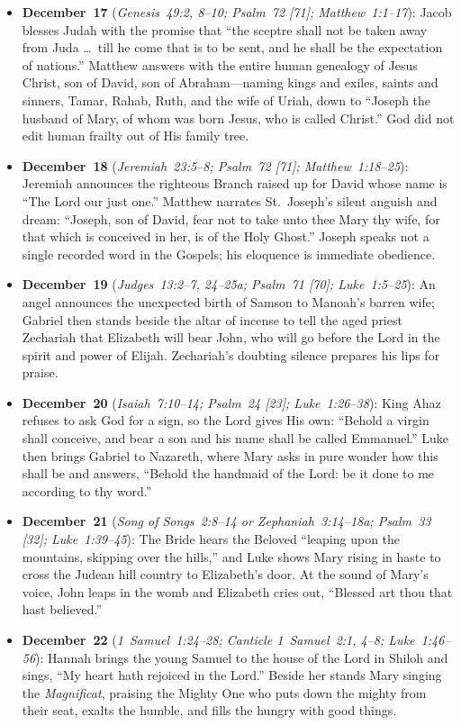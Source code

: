 \begin{itemize}
  \item \textbf{December~17} (\textit{Genesis~49:2, 8--10; Psalm~72 [71]; Matthew~1:1--17}): Jacob blesses Judah with the promise that ``the sceptre shall not be taken away from Juda \dots\ till he come that is to be sent, and he shall be the expectation of nations.'' Matthew answers with the entire human genealogy of Jesus Christ, son of David, son of Abraham---naming kings and exiles, saints and sinners, Tamar, Rahab, Ruth, and the wife of Uriah, down to ``Joseph the husband of Mary, of whom was born Jesus, who is called Christ.'' God did not edit human frailty out of His family tree.
  \item \textbf{December~18} (\textit{Jeremiah~23:5--8; Psalm~72 [71]; Matthew~1:18--25}): Jeremiah announces the righteous Branch raised up for David whose name is ``The Lord our just one.'' Matthew narrates St.~Joseph's silent anguish and dream: ``Joseph, son of David, fear not to take unto thee Mary thy wife, for that which is conceived in her, is of the Holy Ghost.'' Joseph speaks not a single recorded word in the Gospels; his eloquence is immediate obedience.
  \item \textbf{December~19} (\textit{Judges~13:2--7, 24--25a; Psalm~71 [70]; Luke~1:5--25}): An angel announces the unexpected birth of Samson to Manoah's barren wife; Gabriel then stands beside the altar of incense to tell the aged priest Zechariah that Elizabeth will bear John, who will go before the Lord in the spirit and power of Elijah. Zechariah's doubting silence prepares his lips for praise.
  \item \textbf{December~20} (\textit{Isaiah~7:10--14; Psalm~24 [23]; Luke~1:26--38}): King Ahaz refuses to ask God for a sign, so the Lord gives His own: ``Behold a virgin shall conceive, and bear a son and his name shall be called Emmanuel.'' Luke then brings Gabriel to Nazareth, where Mary asks in pure wonder how this shall be and answers, ``Behold the handmaid of the Lord: be it done to me according to thy word.''
  \item \textbf{December~21} (\textit{Song of Songs~2:8--14 or Zephaniah~3:14--18a; Psalm~33 [32]; Luke~1:39--45}): The Bride hears the Beloved ``leaping upon the mountains, skipping over the hills,'' and Luke shows Mary rising in haste to cross the Judean hill country to Elizabeth's door. At the sound of Mary's voice, John leaps in the womb and Elizabeth cries out, ``Blessed art thou that hast believed.''
  \item \textbf{December~22} (\textit{1~Samuel~1:24--28; Canticle 1~Samuel~2:1, 4--8; Luke~1:46--56}): Hannah brings the young Samuel to the house of the Lord in Shiloh and sings, ``My heart hath rejoiced in the Lord.'' Beside her stands Mary singing the \textit{Magnificat}, praising the Mighty One who puts down the mighty from their seat, exalts the humble, and fills the hungry with good things.

\end{itemize}
